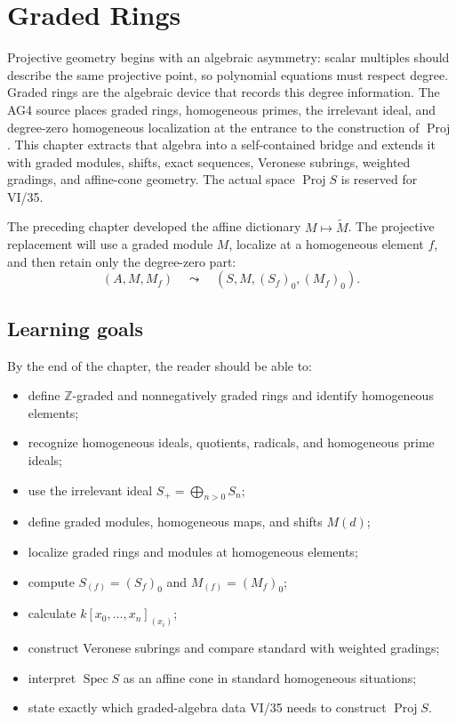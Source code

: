 \chapter{Graded Rings}
\label{ch:vi34-graded-rings}

Projective geometry begins with an algebraic asymmetry: scalar multiples should describe the same projective point, so polynomial equations must respect degree. Graded rings are the algebraic device that records this degree information. The AG4 source places graded rings, homogeneous primes, the irrelevant ideal, and degree-zero homogeneous localization at the entrance to the construction of \(\operatorname{Proj}\). This chapter extracts that algebra into a self-contained bridge and extends it with graded modules, shifts, exact sequences, Veronese subrings, weighted gradings, and affine-cone geometry. The actual space \(\operatorname{Proj}S\) is reserved for VI/35.

The preceding chapter developed the affine dictionary \(M\mapsto\widetilde M\). The projective replacement will use a graded module \(M\), localize at a homogeneous element \(f\), and then retain only the degree-zero part:
\[
\boxed{(A,M,M_f)\quad\leadsto\quad(S,M,(S_f)_0,(M_f)_0).}
\]

\section*{Learning goals}
By the end of the chapter, the reader should be able to:
\begin{itemize}
\item define \(\mathbb Z\)-graded and nonnegatively graded rings and identify homogeneous elements;
\item recognize homogeneous ideals, quotients, radicals, and homogeneous prime ideals;
\item use the irrelevant ideal \(S_+=\bigoplus_{n>0}S_n\);
\item define graded modules, homogeneous maps, and shifts \(M(d)\);
\item localize graded rings and modules at homogeneous elements;
\item compute \(S_{(f)}=(S_f)_0\) and \(M_{(f)}=(M_f)_0\);
\item calculate \(k[x_0,\ldots,x_n]_{(x_i)}\);
\item construct Veronese subrings and compare standard with weighted gradings;
\item interpret \(\operatorname{Spec}S\) as an affine cone in standard homogeneous situations;
\item state exactly which graded-algebra data VI/35 needs to construct \(\operatorname{Proj}S\).
\end{itemize}

